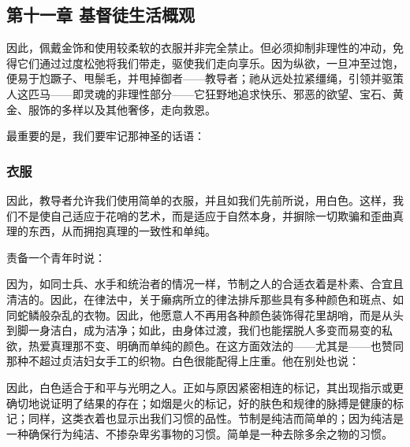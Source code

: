 
\subsection{第十一章 基督徒生活概观}

因此，佩戴金饰和使用较柔软的衣服并非完全禁止。但必须抑制非理性的冲动，免得它们通过过度松弛将我们带走，驱使我们走向享乐。因为纵欲，一旦冲至过饱，便易于尥蹶子、甩鬃毛，并甩掉御者——教导者；祂从远处拉紧缰绳，引领并驱策人这匹马——即灵魂的非理性部分——它狂野地追求快乐、邪恶的欲望、宝石、黄金、服饰的多样以及其他奢侈，走向救恩。\par

最重要的是，我们要牢记那神圣的话语：\par


\subsubsection{衣服}

因此，教导者允许我们使用简单的衣服，并且如我们先前所说，用白色。这样，我们不是使自己适应于花哨的艺术，而是适应于自然本身，并摒除一切欺骗和歪曲真理的东西，从而拥抱真理的一致性和单纯。\par

责备一个青年时说：\par

\par

因为，如同士兵、水手和统治者的情况一样，节制之人的合适衣着是朴素、合宜且清洁的。因此，在律法中，关于癞病所立的律法排斥那些具有多种颜色和斑点、如同蛇鳞般杂乱的衣物。因此，他愿意人不再用各种颜色装饰得花里胡哨，而是从头到脚一身洁白，成为洁净；如此，由身体过渡，我们也能摆脱人多变而易变的私欲，热爱真理那不变、明确而单纯的颜色。在这方面效法的——尤其是——也赞同那种不超过贞洁妇女手工的织物。白色很能配得上庄重。他在别处也说：\par

因此，白色适合于和平与光明之人。正如与原因紧密相连的标记，其出现指示或更确切地说证明了结果的存在；如烟是火的标记，好的肤色和规律的脉搏是健康的标记；同样，这类衣着也显示出我们习惯的品性。节制是纯洁而简单的；因为纯洁是一种确保行为纯洁、不掺杂卑劣事物的习惯。简单是一种去除多余之物的习惯。\par

